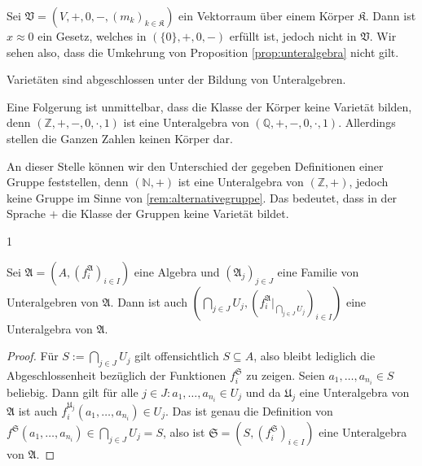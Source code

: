 \begin{remark}
    Sei $\mathfrak{V}=(V,+,0,-,(m_k)_{k\in\mathfrak{K}})$ ein Vektorraum über einem Körper $\mathfrak{K}$.
    Dann ist $x\approx 0$ ein Gesetz, welches in $(\{0\},+,0,-)$ erfüllt ist, jedoch nicht in $\mathfrak{V}$.
    Wir sehen also, dass die Umkehrung von Proposition \ref{prop:unteralgebra} nicht gilt.
\end{remark}

\begin{corollary}
    Varietäten sind abgeschlossen unter der Bildung von Unteralgebren.
\end{corollary}

\begin{remark}
    Eine Folgerung ist unmittelbar, dass die Klasse der Körper keine Varietät bilden,
    denn $(\mathbb{Z},+,-,0,\cdot,1)$ ist eine Unteralgebra von $(\mathbb{Q},+,-,0,\cdot,1)$.
    Allerdings stellen die Ganzen Zahlen keinen Körper dar.
\end{remark}

\begin{remark}
    An dieser Stelle können wir den Unterschied der gegeben Definitionen einer Gruppe feststellen,
    denn $(\mathbb{N},+)$ ist eine Unteralgebra von $(\mathbb{Z},+)$, jedoch keine Gruppe im Sinne von 
    \ref{rem:alternativegruppe}. Das bedeutet, dass in der Sprache $+$ die Klasse der Gruppen keine Varietät bildet.
\end{remark}

\vspace*{-\lineskip}1

\begin{proposition}
    Sei $\mathfrak{A}=(A,(f^\mathfrak{A}_i)_{i\in I})$ eine Algebra und $(\mathfrak{A}_j)_{j\in J}$ eine Familie von Unteralgebren
    von $\mathfrak{A}$. Dann ist auch $(\bigcap_{j\in J}U_j,(f^\mathfrak{A}_i\vert_{\bigcap_{j\in J}U_j})_{i\in I})$ eine Unteralgebra von $\mathfrak{A}$.
\end{proposition}

\begin{proof}
    Für $S:=\bigcap_{j\in J}U_j$ gilt offensichtlich $S\subseteq A$, also bleibt lediglich die Abgeschlossenheit bezüglich
    der Funktionen $f^\mathfrak{S}_i$ zu zeigen. Seien $a_1,\ldots,a_{n_i}\in S$ beliebig. Dann gilt für alle
    $j\in J:a_1,\ldots,a_{n_i}\in U_j$ und da $\mathfrak{U}_j$ eine Unteralgebra von $\mathfrak{A}$ ist auch $f^{\mathfrak{U}_j}_i(a_1,\ldots,a_{n_i})\in U_j$.
    Das ist genau die Definition von $f^\mathfrak{S}(a_1,\ldots,a_{n_i})\in \bigcap_{j\in J}U_j=S$, also ist $\mathfrak{S}=(S,(f^\mathfrak{S}_i)_{i\in I})$ eine Unteralgebra von $\mathfrak{A}$.
\end{proof}

